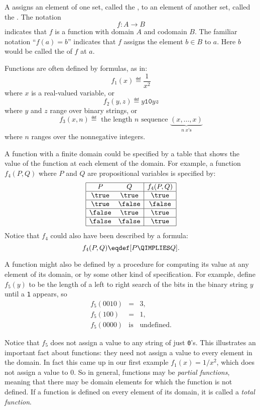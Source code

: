 A  assigns an element of one set, called the
, to an element of another set, called the
.  The notation
\[
f: A \to B
\]
indicates that $f$ is a function with domain $A$ and codomain $B$.  The
familiar notation ``$f(a) = b$'' indicates that $f$ assigns the element $b
\in B$ to $a$.  Here $b$ would be called the  of $f$ at
 $a$.

Functions are often defined by formulas, as in:
\[
f_1(x) \eqdef \frac{1}{x^2}
\]
where $x$ is a real-valued variable, or
\[
f_2(y,z) \eqdef y\mathtt{10}yz
\]
where $y$ and $z$ range over binary strings, or
\[
f_3(x, n) \eqdef \text{ the length $n$ sequence } \underbrace{(x, \dots, x)}_{n\ x\text{'s}}
\]
where $n$ ranges over the nonnegative integers.

A function with a finite domain could be specified by a table that shows
the value of the function at each element of the domain.  For example, a function
$f_4(P,Q)$ where $P$ and $Q$ are propositional variables is specified by:
\[\begin{array}{|cc|c|}
\hline
P & Q & f_4(P,Q)\\
\hline \true & \true & \true\\
\hline \true & \false & \false\\
\hline \false & \true & \true\\
\hline \false & \false & \true\\
\hline
\end{array}\]
Notice that $f_4$ could also have been described by a formula:
\[
f_4(P,Q)  \eqdef [P \QIMPLIES Q].
\]

A function might also be defined by a procedure for computing its value at
any element of its domain, or by some other kind of specification.  For
example, define $f_5(y)$ to be the length of a left to right search of the
bits in the binary string $y$ until a \texttt{1} appears, so
\begin{eqnarray*}
f_5(0010) & = &  3,\\
f_5(100)  & = & 1,\\
f_5(0000) & \text{is} & \text{undefined}.
\end{eqnarray*}

Notice that $f_5$ does not assign a value to any string of just \texttt{0}'s.
This illustrates an important fact about functions: they need not assign a
value to every element in the domain.  In fact this came up in our first
example $f_1(x)=1/x^2$, which does not assign a value to $0$.  So in
general, functions may be \emph{partial%
functions}, meaning that there may be domain
elements for which the function is not defined.  If a function is defined
on every element of its domain, it is called a \emph{total%
function}.


